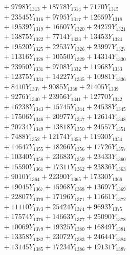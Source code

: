\documentclass[a4paper,10pt]{article}
\begin{document}
{\begin{align}
&\;  + 9798 Y_{1313} + 18778 Y_{1314} + 7170 Y_{1315} \\[0.3ex]
&\;  + 23545 Y_{1316} + 9795 Y_{1317} + 12659 Y_{1318} \\[0.5ex]\allowbreak
&\;  + 19539 Y_{1319} + 16607 Y_{1320} + 24279 Y_{1321} \\[0.3ex]
&\;  + 13875 Y_{1322} + 7714 Y_{1323} + 13453 Y_{1324} \\[0.3ex]
&\;  + 19520 Y_{1325} + 22537 Y_{1326} + 23997 Y_{1327} \\[0.3ex]
&\;  + 11316 Y_{1328} + 10550 Y_{1329} + 14314 Y_{1330} \\[0.3ex]
&\;  + 23950 Y_{1331} + 9708 Y_{1332} + 11968 Y_{1333} \\[0.3ex]
&\;  + 12375 Y_{1334} + 14227 Y_{1335} + 10981 Y_{1336} \\[0.3ex]
&\;  + 8410 Y_{1337} + 9085 Y_{1338} + 21405 Y_{1339} \\[0.3ex]
&\;  + 9276 Y_{1340} + 23956 Y_{1341} + 12770 Y_{1342} \\[0.3ex]
&\;  + 16238 Y_{1343} + 15745 Y_{1344} + 24538 Y_{1345} \\[0.3ex]
&\;  + 17506 Y_{1346} + 20977 Y_{1347} + 12614 Y_{1348} \\[0.5ex]\allowbreak
&\;  + 20734 Y_{1349} + 13818 Y_{1350} + 24557 Y_{1351} \\[0.3ex]
&\;  + 7488 Y_{1352} + 12174 Y_{1353} + 11930 Y_{1354} \\[0.3ex]
&\;  + 14647 Y_{1355} + 18266 Y_{1356} + 17726 Y_{1357} \\[0.3ex]
&\;  + 10340 Y_{1358} + 23683 Y_{1359} + 23433 Y_{1360} \\[0.3ex]
&\;  + 15590 Y_{1361} + 17311 Y_{1362} + 23836 Y_{1363} \\[0.3ex]
&\;  + 9010 Y_{1364} + 22390 Y_{1365} + 17330 Y_{1366} \\[0.3ex]
&\;  + 19045 Y_{1367} + 15968 Y_{1368} + 13697 Y_{1369} \\[0.3ex]
&\;  + 22807 Y_{1370} + 17196 Y_{1371} + 11661 Y_{1372} \\[0.3ex]
&\;  + 11110 Y_{1373} + 25424 Y_{1374} + 9693 Y_{1375} \\[0.3ex]
&\;  + 17574 Y_{1376} + 14663 Y_{1377} + 25090 Y_{1378} \\[0.5ex]\allowbreak
&\;  + 10069 Y_{1379} + 19325 Y_{1380} + 16849 Y_{1381} \\[0.3ex]
&\;  + 13358 Y_{1382} + 23072 Y_{1383} + 24644 Y_{1384} \\[0.3ex]
&\;  + 13145 Y_{1385} + 17234 Y_{1386} + 19131 Y_{1387} \\[0.3ex]

\end{align}}
\end{document}
